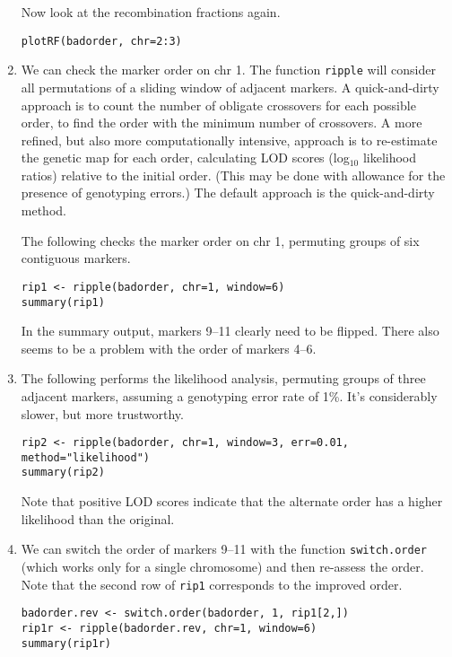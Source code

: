 \documentclass[10pt,letterpaper]{article}
\newcommand{\usercolor}{\color [named]{BlueViolet}}
\begin{document}
\begin{enumerate}
Now look at the recombination fractions again.

\usercolor \verb|plotRF(badorder, chr=2:3)| \normalcolor

\item We can check the marker order on chr 1.  The function
\verb-ripple- will consider all permutations of a sliding window of
adjacent markers.  A quick-and-dirty approach is to count the number
of obligate crossovers for each possible order, to find the order with
the minimum number of crossovers.  A more refined, but also more
computationally intensive, approach is to 
re-estimate the genetic map for each order, calculating LOD
scores (log$_{10}$ likelihood ratios) relative to the initial order.
(This may be done with allowance for the presence of genotyping
errors.)  The default approach is the quick-and-dirty method.

The following checks the marker order on chr 1, permuting
groups of six contiguous markers.  

\usercolor
\verb|rip1 <- ripple(badorder, chr=1, window=6)| \\
\verb|summary(rip1)| 
\normalcolor

In the summary output, markers 9--11 clearly need to be flipped.
There also seems to be a problem with the order of markers 4--6.  

\item The following performs the likelihood analysis, permuting groups of
three adjacent markers, assuming a genotyping error rate of
1\%.  It's considerably slower, but more trustworthy.
 
\usercolor 
\verb|rip2 <- ripple(badorder, chr=1, window=3, err=0.01, method="likelihood")| \\
\verb|summary(rip2)|
\normalcolor

Note that positive LOD scores indicate that the alternate order has a
higher likelihood than the original.

\item We can switch the order of markers 9--11 with the function
\verb-switch.order- (which works only for a single chromosome) and
then re-assess the order.  Note that the second row of \verb-rip1-
corresponds to the improved order.  

\usercolor
\verb|badorder.rev <- switch.order(badorder, 1, rip1[2,])| \\
\verb|rip1r <- ripple(badorder.rev, chr=1, window=6)| \\
\verb|summary(rip1r)|
\normalcolor


\end{enumerate}
\end{document}
